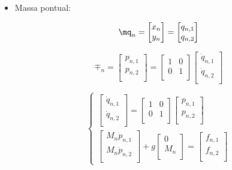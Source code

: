 \begin{itemize}

\item Massa pontual:

\begin{equation}
	\mq_n = \begin{bmatrix}
	x_n \\
	y_n \\
	\end{bmatrix}
	=
	\begin{bmatrix}
	q_{n,1} \\
	q_{n,2} \\
	\end{bmatrix}
\end{equation}

\begin{equation}
	\mp_n = \begin{bmatrix}
	p_{n,1} \\
	p_{n,2} \\
	\end{bmatrix}
	=
	\begin{bmatrix}
	1 & 0 \\
	0 & 1 \\
	\end{bmatrix}
	\begin{bmatrix}
	\dot{q}_{n,1} \\
	\dot{q}_{n,2} \\
	\end{bmatrix}
\end{equation}

\begin{equation}
	\begin{cases}

	\begin{bmatrix}
	\dot{q}_{n,1} \\
	\dot{q}_{n,2} \\
	\end{bmatrix}
	=
	\begin{bmatrix}
	1 & 0 \\
	0 & 1 \\
	\end{bmatrix}
	\begin{bmatrix}
	p_{n,1} \\
	p_{n,2} \\
	\end{bmatrix} \\

	\begin{bmatrix}
	M_n \dot{p}_{n,1} \\
	M_n \dot{p}_{n,2} \\
	\end{bmatrix}
	+
	g \begin{bmatrix}
	0 \\
	M_n \\
	\end{bmatrix}
	=
	\begin{bmatrix}
	f_{n, 1} \\
	f_{n, 2} \\
	\end{bmatrix}
	\end{cases}
\end{equation}


\end{itemize}
